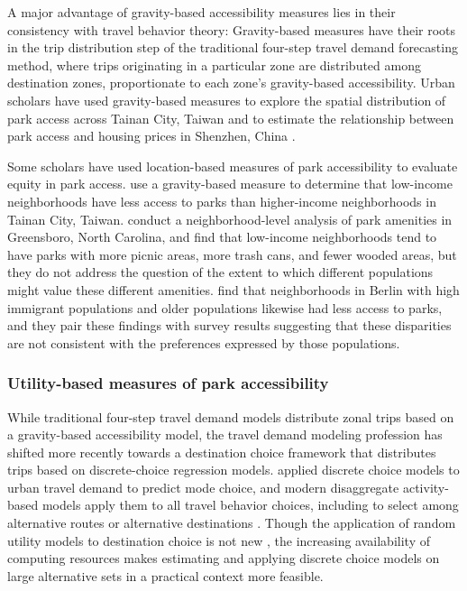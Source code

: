 \documentclass[3p, authoryear, review]{elsarticle} %
\begin{document}
A major advantage of gravity-based accessibility measures lies in their consistency with travel behavior theory: Gravity-based measures have their roots in the trip distribution step of the traditional four-step travel demand forecasting method, where trips originating in a particular zone are distributed among destination zones, proportionate to each zone's gravity-based accessibility. Urban scholars have used gravity-based measures to explore the spatial distribution of park access across Tainan City, Taiwan \citep{chang2011exploring} and to estimate the relationship between park access and housing prices in Shenzhen, China \citep{wu2017spatial}.

Some scholars have used location-based measures of park accessibility to evaluate equity in park access. \citet{chang2011exploring} use a gravity-based measure to determine that low-income neighborhoods have less access to parks than higher-income neighborhoods in Tainan City, Taiwan. \citet{bruton2014disparities} conduct a neighborhood-level analysis of park amenities in Greensboro, North Carolina, and find that low-income neighborhoods tend to have parks with more picnic areas, more trash cans, and fewer wooded areas, but they do not address the question of the extent to which different populations might value these different amenities. \citet{kabisch2014green} find that neighborhoods in Berlin with high immigrant populations and older populations likewise had less access to parks, and they pair these findings with survey results suggesting that these disparities are not consistent with the preferences expressed by those populations.

\hypertarget{utility-based-measures-of-park-accessibility}{%
\subsubsection{Utility-based measures of park accessibility}\label{utility-based-measures-of-park-accessibility}}

While traditional four-step travel demand models distribute zonal trips based on a gravity-based accessibility model, the travel demand modeling profession has shifted more recently towards a destination choice framework that distributes trips based on discrete-choice regression models. \citet{mcfadden1974} applied discrete choice models to urban travel demand to predict mode choice, and modern disaggregate activity-based models apply them to all travel behavior choices, including to select among alternative routes or alternative destinations \citep{de2011modelling}. Though the application of random utility models to destination choice is not new \citep[see][]{anas1983discrete}, the increasing availability of computing resources makes estimating and applying discrete choice models on large alternative sets in a practical context more feasible.
\end{document}
